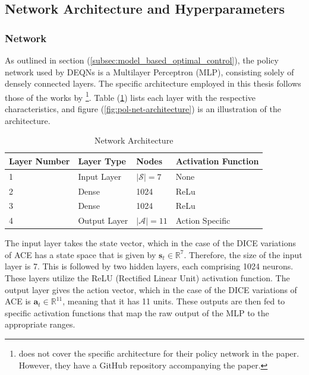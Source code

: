 \subsection{Network Architecture and Hyperparameters}

\subsubsection{Network}
As outlined in section (\ref{subsec:model_based_optimal_control}), the policy network used by DEQNs is a Multilayer Perceptron (MLP), consisting solely of densely connected layers. The specific architecture employed in this thesis follows those of the works by \textcite{Azinovic2022DEQN, friedl2023_deepUQ, Folini2024ClimateInCE}\footnote{\textcite{Folini2024ClimateInCE} does not cover the specific architecture for their policy network in the paper. However, they have a GitHub repository accompanying the paper.}. Table (\ref{table:Network_Architecture}) lists each layer with the respective characteristics, and figure (\ref{fig:pol-net-architecture}) is an illustration of the architecture. 

\begin{table}[ht]
\centering
\begin{tabular}{llll}
    \toprule
    Layer Number & Layer Type & Nodes & Activation Function \\
    \midrule
    1 & Input Layer & \(|\mathcal{S}|=7\) & None \\
    2 & Dense & 1024 & ReLu \\
    3 & Dense & 1024 & ReLu \\
    4 & Output Layer & \(|\mathcal{A}|=11\) & Action Specific \\
    \bottomrule
\end{tabular}
\caption{Network Architecture}
\label{table:Network_Architecture}
\end{table}

The input layer takes the state vector, which in the case of the DICE variations of ACE has a state space that is given by \(\bm{s}_t \in \mathbb{R}^7\). Therefore, the size of the input layer is 7. This is followed by two hidden layers, each comprising 1024 neurons. These layers utilize the ReLU (Rectified Linear Unit) activation function. The output layer gives the action vector, which in the case of the DICE variations of ACE is \(\bm{a}_t \in \mathbb{R}^{11}\), meaning that it has 11 units. These outputs are then fed to specific activation functions that map the raw output of the MLP to the appropriate ranges.

